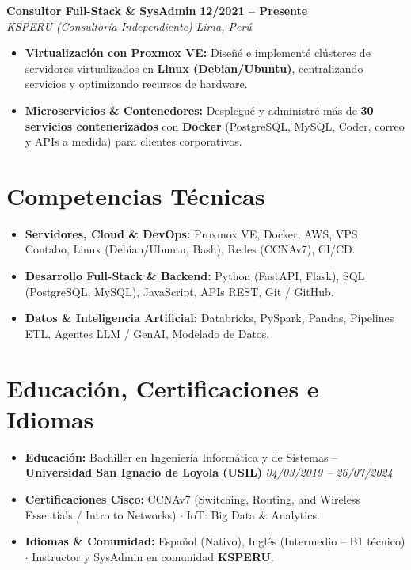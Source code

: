 \documentclass[10pt, a4paper]{article}
\newcommand{\entryheader}[4]{%
  \noindent\textbf{#1} \hfill \textbf{#2}\\
  \noindent\textit{#3} \hfill \textit{#4}\par
  \vspace{0.08em}
}
\begin{document}
\entryheader{Consultor Full-Stack \& SysAdmin}{12/2021 -- Presente}{KSPERU (Consultoría Independiente)}{Lima, Perú}
\begin{itemize}
    \item \textbf{Virtualización con Proxmox VE:} Diseñé e implementé clústeres de servidores virtualizados en \textbf{Linux (Debian/Ubuntu)}, centralizando servicios y optimizando recursos de hardware.
    \item \textbf{Microservicios \& Contenedores:} Desplegué y administré más de \textbf{30 servicios contenerizados} con \textbf{Docker} (PostgreSQL, MySQL, Coder, correo y APIs a medida) para clientes corporativos.
\end{itemize}

\section{Competencias Técnicas}
\begin{itemize}
    \item \textbf{Servidores, Cloud \& DevOps:} Proxmox VE, Docker, AWS, VPS Contabo, Linux (Debian/Ubuntu, Bash), Redes (CCNAv7), CI/CD.
    \item \textbf{Desarrollo Full-Stack \& Backend:} Python (FastAPI, Flask), SQL (PostgreSQL, MySQL), JavaScript, APIs REST, Git / GitHub.
    \item \textbf{Datos \& Inteligencia Artificial:} Databricks, PySpark, Pandas, Pipelines ETL, Agentes LLM / GenAI, Modelado de Datos.
\end{itemize}

\section{Educación, Certificaciones e Idiomas}
\begin{itemize}
    \item \textbf{Educación:} Bachiller en Ingeniería Informática y de Sistemas -- \textbf{Universidad San Ignacio de Loyola (USIL)} \hfill \textit{04/03/2019 -- 26/07/2024}
    \item \textbf{Certificaciones Cisco:} CCNAv7 (Switching, Routing, and Wireless Essentials / Intro to Networks) $\cdot$ IoT: Big Data \& Analytics.
    \item \textbf{Idiomas \& Comunidad:} Español (Nativo), Inglés (Intermedio -- B1 técnico) $\cdot$ Instructor y SysAdmin en comunidad \textbf{KSPERU}.
\end{itemize}
\end{document}

